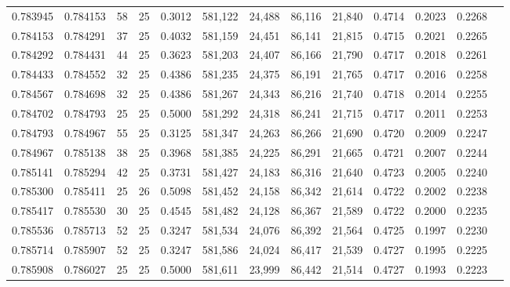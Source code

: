 \begin{tabular}{rrrrrrrrrrrrr}
0.783945 & 0.784153 &    58 &  25 &                                     0.3012 & 581,122 &  24,488 &  86,116 &  21,840 & 0.4714 & 0.2023 & 0.2268 \\
0.784153 & 0.784291 &    37 &  25 &                                     0.4032 & 581,159 &  24,451 &  86,141 &  21,815 & 0.4715 & 0.2021 & 0.2265 \\
0.784292 & 0.784431 &    44 &  25 &                                     0.3623 & 581,203 &  24,407 &  86,166 &  21,790 & 0.4717 & 0.2018 & 0.2261 \\
0.784433 & 0.784552 &    32 &  25 &                                     0.4386 & 581,235 &  24,375 &  86,191 &  21,765 & 0.4717 & 0.2016 & 0.2258 \\
0.784567 & 0.784698 &    32 &  25 &                                     0.4386 & 581,267 &  24,343 &  86,216 &  21,740 & 0.4718 & 0.2014 & 0.2255 \\
0.784702 & 0.784793 &    25 &  25 &                                     0.5000 & 581,292 &  24,318 &  86,241 &  21,715 & 0.4717 & 0.2011 & 0.2253 \\
0.784793 & 0.784967 &    55 &  25 &                                     0.3125 & 581,347 &  24,263 &  86,266 &  21,690 & 0.4720 & 0.2009 & 0.2247 \\
0.784967 & 0.785138 &    38 &  25 &                                     0.3968 & 581,385 &  24,225 &  86,291 &  21,665 & 0.4721 & 0.2007 & 0.2244 \\
0.785141 & 0.785294 &    42 &  25 &                                     0.3731 & 581,427 &  24,183 &  86,316 &  21,640 & 0.4723 & 0.2005 & 0.2240 \\
0.785300 & 0.785411 &    25 &  26 &                                     0.5098 & 581,452 &  24,158 &  86,342 &  21,614 & 0.4722 & 0.2002 & 0.2238 \\
0.785417 & 0.785530 &    30 &  25 &                                     0.4545 & 581,482 &  24,128 &  86,367 &  21,589 & 0.4722 & 0.2000 & 0.2235 \\
0.785536 & 0.785713 &    52 &  25 &                                     0.3247 & 581,534 &  24,076 &  86,392 &  21,564 & 0.4725 & 0.1997 & 0.2230 \\
0.785714 & 0.785907 &    52 &  25 &                                     0.3247 & 581,586 &  24,024 &  86,417 &  21,539 & 0.4727 & 0.1995 & 0.2225 \\
0.785908 & 0.786027 &    25 &  25 &                                     0.5000 & 581,611 &  23,999 &  86,442 &  21,514 & 0.4727 & 0.1993 & 0.2223 \\

\end{tabular}
